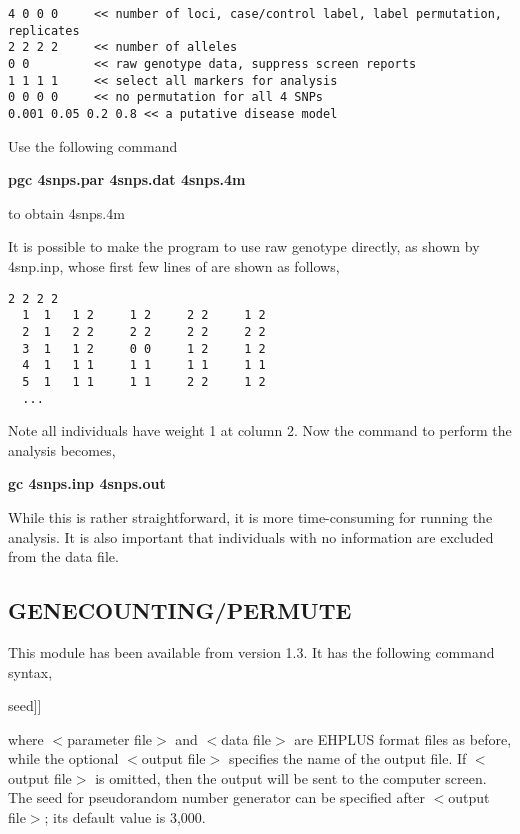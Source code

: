\documentclass[11pt]{article}
\begin{document}
{\small
\begin{verbatim}
4 0 0 0     << number of loci, case/control label, label permutation, replicates
2 2 2 2     << number of alleles
0 0         << raw genotype data, suppress screen reports
1 1 1 1     << select all markers for analysis
0 0 0 0     << no permutation for all 4 SNPs
0.001 0.05 0.2 0.8 << a putative disease model
\end{verbatim}
}

\medskip\noindent Use the following command

\medskip
{\bf pgc 4snps.par 4snps.dat 4snps.4m}
\medskip

\noindent to obtain 4snps.4m

\medskip\noindent It is possible to make the program to use raw genotype
directly, as shown by 4snp.inp, whose first few lines of are shown
as follows,

\begin{verbatim}
2 2 2 2
  1  1   1 2     1 2     2 2     1 2
  2  1   2 2     2 2     2 2     2 2
  3  1   1 2     0 0     1 2     1 2
  4  1   1 1     1 1     1 1     1 1
  5  1   1 1     1 1     2 2     1 2
  ...
\end{verbatim}

\medskip\noindent Note all individuals have weight 1 at column 2.  Now the
command to perform the analysis becomes,

\medskip
{\bf gc 4snps.inp 4snps.out}
\medskip

\medskip\noindent While this is rather straightforward, it is more
time-consuming for running the analysis.  It is also important that
individuals with no information are excluded from the data file.


\subsection{GENECOUNTING/PERMUTE}

\medskip\noindent This module has been available from version 1.3. It has
the following command syntax,

\medskip
\noindent{\small\bf gcp $<$parameter file$>$ $<$data file$>$
[$<$output file$>$ [random number} seed]]
\medskip

\medskip\noindent where $<$parameter file$>$ and $<$data file$>$ are EHPLUS
format files as before, while the optional $<$output file$>$
specifies the name of the output file. If $<$output file$>$ is
omitted, then the output will be sent to the computer screen. The
seed for pseudorandom number generator can be specified after
$<$output file$>$; its default value is 3,000.
\end{document}
